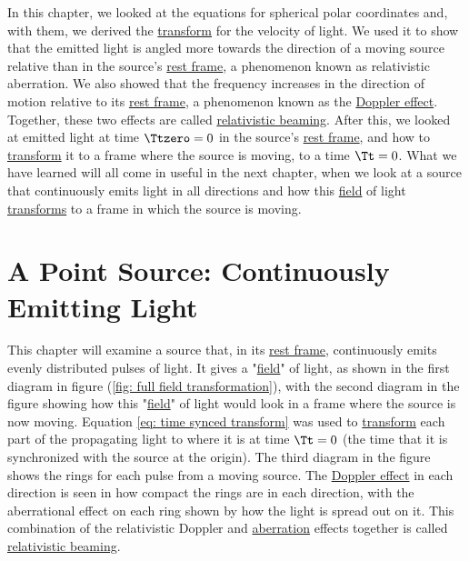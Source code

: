 In this chapter, we looked at the equations for spherical polar coordinates and, with them, we derived the \hyperlink{def-transform}{transform} for the velocity of light.
We used it to show that the emitted light is angled more towards the direction of a moving source relative than in the source's \hyperlink{def-proper-frame}{rest frame}, a phenomenon known as relativistic aberration.
We also showed that the frequency increases in the direction of motion relative to its \hyperlink{def-proper-frame}{rest frame}, a phenomenon known as the \hyperlink{def-doppler-effect}{Doppler effect}.
Together, these two effects are called \hyperlink{def-relativistic-beaming}{relativistic beaming}.
After this, we looked at emitted light at time $\Ttzero =0$ in the source's \hyperlink{def-proper-frame}{rest frame}, and how to \hyperlink{def-transform}{transform} it to a frame where the source is moving, to a time $\Tt =0$.
What we have learned will all come in useful in the next chapter, when we look at a source that continuously emits light in all directions and how this \hyperlink{def-field}{field} of light \hyperlink{def-transform}{transforms} to a frame in which the source is moving.


%

\printbibliography[segment=\therefsegment, heading=subbibliography]

\chapter{A Point Source: Continuously Emitting Light} \label{ch: A Point Source Continually Emitting Light} %

This chapter will examine a source that, in its \hyperlink{def-proper-frame}{rest frame}, continuously emits evenly distributed pulses of light.
It gives a "\hyperlink{def-field}{field}" of light, as shown in the first diagram in figure (\ref{fig: full field transformation}), with the second diagram in the figure showing how this "\hyperlink{def-field}{field}" of light would look in a frame where the source is now moving.
Equation \eqref{eq: time synced transform} was used to \hyperlink{def-transform}{transform} each part of the propagating light to where it is at time $\Tt =0$ (the time that it is synchronized with the source at the origin).
The third diagram in the figure shows the rings for each pulse from a moving source.
The \hyperlink{def-doppler-effect}{Doppler effect} in each direction is seen in how compact the rings are in each direction, with the aberrational effect on each ring shown by how the light is spread out on it.
This combination of the relativistic Doppler and \hyperlink{def-aberration}{aberration} effects together is called \hyperlink{def-relativistic-beaming}{relativistic beaming}.


